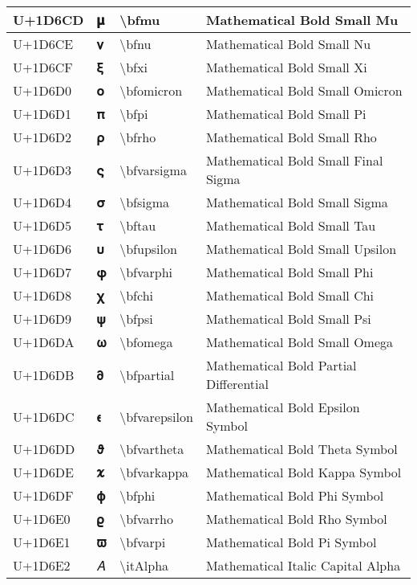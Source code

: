 \begin{table}[h]
\begin{tabulary}{\linewidth}{|L|L|L|L|}
\hline
U+1D6CD & 𝛍 & {\textbackslash}bfmu & Mathematical Bold Small Mu \\
\hline
U+1D6CE & 𝛎 & {\textbackslash}bfnu & Mathematical Bold Small Nu \\
\hline
U+1D6CF & 𝛏 & {\textbackslash}bfxi & Mathematical Bold Small Xi \\
\hline
U+1D6D0 & 𝛐 & {\textbackslash}bfomicron & Mathematical Bold Small Omicron \\
\hline
U+1D6D1 & 𝛑 & {\textbackslash}bfpi & Mathematical Bold Small Pi \\
\hline
U+1D6D2 & 𝛒 & {\textbackslash}bfrho & Mathematical Bold Small Rho \\
\hline
U+1D6D3 & 𝛓 & {\textbackslash}bfvarsigma & Mathematical Bold Small Final Sigma \\
\hline
U+1D6D4 & 𝛔 & {\textbackslash}bfsigma & Mathematical Bold Small Sigma \\
\hline
U+1D6D5 & 𝛕 & {\textbackslash}bftau & Mathematical Bold Small Tau \\
\hline
U+1D6D6 & 𝛖 & {\textbackslash}bfupsilon & Mathematical Bold Small Upsilon \\
\hline
U+1D6D7 & 𝛗 & {\textbackslash}bfvarphi & Mathematical Bold Small Phi \\
\hline
U+1D6D8 & 𝛘 & {\textbackslash}bfchi & Mathematical Bold Small Chi \\
\hline
U+1D6D9 & 𝛙 & {\textbackslash}bfpsi & Mathematical Bold Small Psi \\
\hline
U+1D6DA & 𝛚 & {\textbackslash}bfomega & Mathematical Bold Small Omega \\
\hline
U+1D6DB & 𝛛 & {\textbackslash}bfpartial & Mathematical Bold Partial Differential \\
\hline
U+1D6DC & 𝛜 & {\textbackslash}bfvarepsilon & Mathematical Bold Epsilon Symbol \\
\hline
U+1D6DD & 𝛝 & {\textbackslash}bfvartheta & Mathematical Bold Theta Symbol \\
\hline
U+1D6DE & 𝛞 & {\textbackslash}bfvarkappa & Mathematical Bold Kappa Symbol \\
\hline
U+1D6DF & 𝛟 & {\textbackslash}bfphi & Mathematical Bold Phi Symbol \\
\hline
U+1D6E0 & 𝛠 & {\textbackslash}bfvarrho & Mathematical Bold Rho Symbol \\
\hline
U+1D6E1 & 𝛡 & {\textbackslash}bfvarpi & Mathematical Bold Pi Symbol \\
\hline
U+1D6E2 & 𝛢 & {\textbackslash}itAlpha & Mathematical Italic Capital Alpha \\

\end{tabulary}
\end{table}
